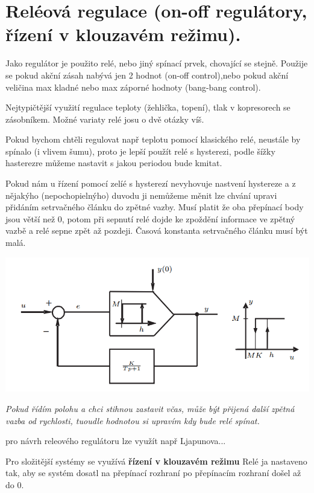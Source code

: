 \section{Reléová regulace (on-off regulátory, řízení v klouzavém režimu).
}

Jako regulátor je použito relé, nebo jiný spínací prvek, chovající se stejně. 
Použije se pokud akční zásah nabývá jen 2 hodnot (on-off control),nebo pokud akční veličina max kladné nebo max záporné hodnoty (bang-bang control).

Nejtypičtější využití regulace teploty (žehlička, topení), tlak v kopresorech se zásobníkem.
Možné variaty relé josu o dvě otázky víš.

Pokud bychom chtěli regulovat např teplotu pomocí klasického relé, neustále by spínalo  (i vlivem šumu), proto je lepší použít relé s hysterezi, podle šížky hasterezre můžeme nastavit s jakou periodou bude kmitat.

Pokud nám u řízení pomocí zelíé s hysterezí nevyhovuje nastvení hystereze a z nějakýho (nepochopielnýho) duvodu ji nemůžeme měnit lze chvání upravi přidáním setrvačného článku do zpětné vazby.
Musí platit že oba přepínací body jsou větší než 0, potom při sepnutí relé dojde ke zpoždění informace ve zpětný vazbě a relé sepne zpět až pozdeji. Časová konstanta setrvačného článku musí být malá.


\includegraphics{img/rele_reg.png}

{ \it
Pokud řídím polohu a chci stihnou zastavit včas, může být přijená další zpětná vazba od rychlosti, tuoudle hodnotou si upravím kdy bude relé spínat.
}

pro návrh releového regulátoru lze využít např Ljapunova...

Pro složitější systémy se využívá {\bf řízení v klouzavém režimu}
Relé ja nastaveno tak, aby se systém dosatl na přepínací rozhraní  po přepínacím rozhraní došel až do 0.

